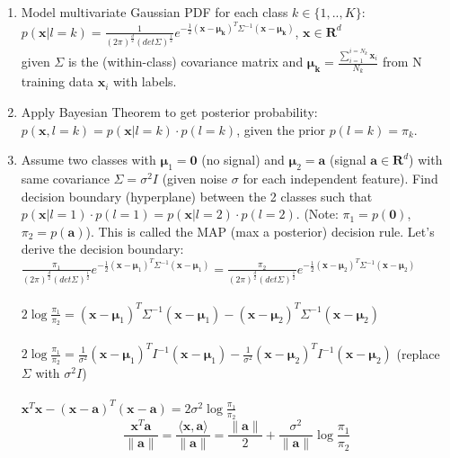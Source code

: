 \documentclass[11pt]{article}
\begin{document}
\begin{enumerate}
    \item Model multivariate Gaussian PDF for each class $k \in \{1,..,K\}$:\\
    $p(\mathbf{x}|l=k) = \frac{1}{{(2\pi)}^{\frac{d}{2}} {(det\Sigma)}^{\frac{1}{2}}} e^{-\frac{1}{2}{(\mathbf{x}-\mathbf{\mu_k})}^T \Sigma^{-1}{(\mathbf{x}-\mathbf{\mu_k})}}$, $\mathbf{x} \in \mathbf{R}^d$\\
    given $\Sigma$ is the (within-class) covariance matrix and $\mathbf{\mu_k} = \frac{\sum_{i=1}^{i=N_k} \mathbf{x}_i}{N_k}$ from N training data $\mathbf{x}_i$ with labels. 
    
    \item Apply Bayesian Theorem to get posterior probability: $p(\mathbf{x}, l=k) = p(\mathbf{x}|l=k) \cdot p(l=k)$, given the prior $p(l=k) = \pi_k$.
    
    \item Assume two classes with $\mathbf{\mu}_1 = \mathbf{0}$ (no signal) and $\mathbf{\mu}_2 = \mathbf{a}$ (signal $\mathbf{a} \in \mathbf{R}^d$) with same covariance $\Sigma = \sigma^2 I$ (given noise $\sigma$ for each independent feature). Find decision boundary (hyperplane) between the 2 classes such that $p(\mathbf{x}|l=1)\cdot p(l=1) = p(\mathbf{x}|l=2)\cdot p(l=2)$. (Note: $\pi_1 = p(\mathbf{0})$, $\pi_2 = p(\mathbf{a})$).
    This is called the MAP (max a posterior) decision rule. Let's derive the decision boundary:
    $\frac{\pi_1}{{(2\pi)}^{\frac{d}{2}} {(det\Sigma)}^{\frac{1}{2}}} e^{-\frac{1}{2}{(\mathbf{x}-\mathbf{\mu}_1)}^T \Sigma^{-1}{(\mathbf{x}-\mathbf{\mu}_1)}} = \frac{\pi_2}{{(2\pi)}^{\frac{d}{2}} {(det\Sigma)}^{\frac{1}{2}}} e^{-\frac{1}{2}{(\mathbf{x}-\mathbf{\mu}_2)}^T \Sigma^{-1}{(\mathbf{x}-\mathbf{\mu}_2)}}$ \\\\
    $2\log{\frac{\pi_1}{\pi_2}} = {(\mathbf{x}-\mathbf{\mu}_1)}^T \Sigma^{-1}{(\mathbf{x}-\mathbf{\mu}_1)} - {(\mathbf{x}-\mathbf{\mu}_2)}^T \Sigma^{-1}{(\mathbf{x}-\mathbf{\mu}_2)}$\\\\
    $2\log{\frac{\pi_1}{\pi_2}} = \frac{1}{\sigma^2}{(\mathbf{x}-\mathbf{\mu}_1)}^T I^{-1}{(\mathbf{x}-\mathbf{\mu}_1)} - \frac{1}{\sigma^2}{(\mathbf{x}-\mathbf{\mu}_2)}^T I^{-1}{(\mathbf{x}-\mathbf{\mu}_2)}$ (replace $\Sigma$ with $\sigma^2 I$)\\\\
    $\mathbf{x}^T\mathbf{x} - {(\mathbf{x}-\mathbf{a})}^T(\mathbf{x}-\mathbf{a}) = 2\sigma^2\log{\frac{\pi_1}{\pi_2}}$
    \begin{equation}
        \frac{\mathbf{x}^T\mathbf{a}}{\lVert \mathbf{a} \rVert} = \frac{\langle \mathbf{x}, \mathbf{a} \rangle}{\lVert \mathbf{a} \rVert} = \frac{\lVert \mathbf{a} \rVert}{2} + \frac{\sigma^2}{\lVert \mathbf{a} \rVert}\log{\frac{\pi_1}{\pi_2}}
    \end{equation}
    

\end{enumerate}
\end{document}
